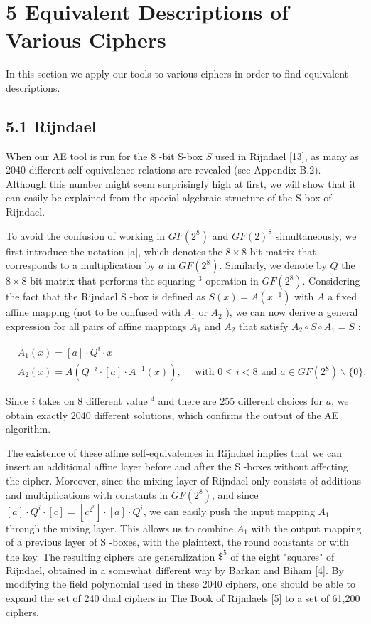 \documentclass[10pt]{article}
\begin{document}
\section*{5 Equivalent Descriptions of Various Ciphers}
In this section we apply our tools to various ciphers in order to find equivalent descriptions.

\subsection*{5.1 Rijndael}
When our AE tool is run for the 8 -bit S-box $S$ used in Rijndael [13], as many as 2040 different self-equivalence relations are revealed (see Appendix B.2). Although this number might seem surprisingly high at first, we will show that it can easily be explained from the special algebraic structure of the S-box of Rijndael.

To avoid the confusion of working in $G F\left(2^{8}\right)$ and $G F(2)^{8}$ simultaneously, we first introduce the notation [a], which denotes the $8 \times 8$-bit matrix that corresponds to a multiplication by $a$ in $G F\left(2^{8}\right)$. Similarly, we denote by $Q$ the $8 \times 8$-bit matrix that performs the squaring ${ }^{3}$ operation in $G F\left(2^{8}\right)$. Considering the fact that the Rijndael S -box is defined as $S(x)=A\left(x^{-1}\right)$ with $A$ a fixed affine mapping (not to be confused with $A_{1}$ or $A_{2}$ ), we can now derive a general expression for all pairs of affine mappings $A_{1}$ and $A_{2}$ that satisfy $A_{2} \circ S \circ A_{1}=S$ :


\begin{align*}
& A_{1}(x)=[a] \cdot Q^{i} \cdot x  \tag{10}\\
& A_{2}(x)=A\left(Q^{-i} \cdot[a] \cdot A^{-1}(x)\right), \quad \text { with } 0 \leq i<8 \text { and } a \in G F\left(2^{8}\right) \backslash\{0\} . \tag{11}
\end{align*}


Since $i$ takes on 8 different value ${ }^{4}$ and there are 255 different choices for $a$, we obtain exactly 2040 different solutions, which confirms the output of the AE algorithm.

The existence of these affine self-equivalences in Rijndael implies that we can insert an additional affine layer before and after the S -boxes without affecting the cipher. Moreover, since the mixing layer of Rijndael only consists of additions and multiplications with constants in $G F\left(2^{8}\right)$, and since $[a] \cdot Q^{i} \cdot[c]=\left[c^{2^{i}}\right] \cdot[a] \cdot Q^{i}$, we can easily push the input mapping $A_{1}$ through the mixing layer. This allows us to combine $A_{1}$ with the output mapping of a previous layer of S -boxes, with the plaintext, the round constants or with the key. The resulting ciphers are generalization $\$^{5}$ of the eight "squares" of Rijndael, obtained in a somewhat different way by Barkan and Biham [4]. By modifying the field polynomial used in these 2040 ciphers, one should be able to expand the set of 240 dual ciphers in The Book of Rijndaels [5] to a set of 61,200 ciphers.
\end{document}
